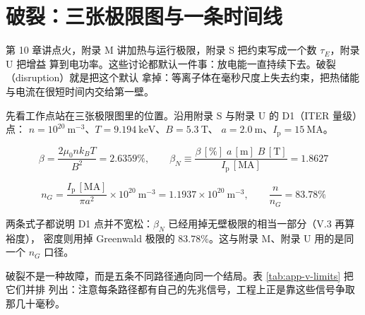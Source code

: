 
\section{破裂：三张极限图与一条时间线}
\label{sec:app-v-what}

第 10 章讲点火，附录 M 讲加热与运行极限，附录 S 把约束写成一个数 $\tau_E$，附录 U 把增益
算到电功率。这些讨论都默认一件事：放电能一直持续下去。破裂（disruption）就是把这个默认
拿掉：等离子体在毫秒尺度上失去约束，把热储能与电流在很短时间内交给第一壁。

先看工作点站在三张极限图里的位置。沿用附录 S 与附录 U 的 D1（ITER 量级）点：
$n=10^{20}\ \mathrm{m^{-3}}$、$T=9.194\ \mathrm{keV}$、$B=5.3\ \mathrm{T}$、
$a=2.0\ \mathrm{m}$、$I_{\mathrm p}=15\ \mathrm{MA}$。

\begin{equation}
\beta = \frac{2\mu_0 n k_B T}{B^2} = 2.6359\%,
\qquad
\beta_N \equiv \frac{\beta\,[\%]\;a\,[\mathrm{m}]\;B\,[\mathrm{T}]}{I_{\mathrm p}\,[\mathrm{MA}]}
= 1.8627
\label{eq:app-v-betan}
\end{equation}

\begin{equation}
n_G = \frac{I_{\mathrm p}\,[\mathrm{MA}]}{\pi a^2}\times10^{20}\ \mathrm{m^{-3}}
= 1.1937\times10^{20}\ \mathrm{m^{-3}},
\qquad
\frac{n}{n_G} = 83.78\%
\label{eq:app-v-greenwald}
\end{equation}

两条式子都说明 D1 点并不宽松：$\beta_N$ 已经用掉无壁极限的相当一部分（V.3 再算裕度），
密度则用掉 Greenwald 极限的 $83.78\%$。这与附录 M、附录 U 用的是同一个 $n_G$ 口径。

破裂不是一种故障，而是五条不同路径通向同一个结局。表 \ref{tab:app-v-limits} 把它们并排
列出：注意每条路径都有自己的先兆信号，工程上正是靠这些信号争取那几十毫秒。

